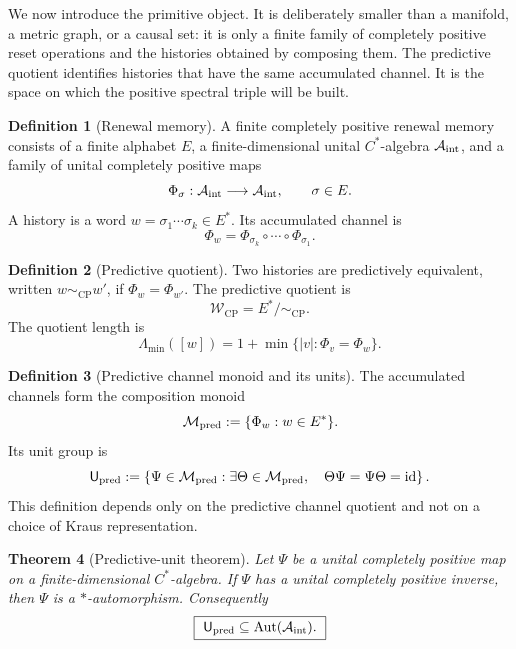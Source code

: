 \documentclass[11pt]{article}
\newtheorem{theorem}{Theorem}[section]
\theoremstyle{definition}
\newtheorem{definition}[theorem]{Definition}
\theoremstyle{remark}
\newcommand{\A}{\mathcal{A}}
\newcommand{\W}{\mathcal{W}}
\newcommand{\M}{\mathcal{M}}
\newcommand{\CP}{\mathrm{CP}}
\newcommand{\Lam}{\Lambda}
\newcommand{\id}{\mathrm{id}}
\begin{document}
We now introduce the primitive object.  It is deliberately smaller than a
manifold, a metric graph, or a causal set: it is only a finite family of
completely positive reset operations and the histories obtained by composing
them.  The predictive quotient identifies histories that have the same accumulated
channel.  It is the space on which the positive spectral triple will be built.

\begin{definition}[Renewal memory]
\label{def:renewal-memory}
A finite completely positive renewal memory consists of a finite alphabet $E$, a finite-dimensional unital $C^*$-algebra $\A_{\rm int}$, and a family of unital completely positive maps
\[
 \Phi_\sigma:\A_{\rm int}\longrightarrow \A_{\rm int},\qquad \sigma\in E.
\]
A history is a word $w=\sigma_1\cdots\sigma_k\in E^*$.  Its accumulated channel is
\[
 \Phi_w=\Phi_{\sigma_k}\circ\cdots\circ\Phi_{\sigma_1}.
\]
\end{definition}

\begin{definition}[Predictive quotient]
\label{def:predictive-quotient}
Two histories are predictively equivalent, written $w\sim_{\CP}w'$, if $\Phi_w=\Phi_{w'}$.  The predictive quotient is
\[
 \W_{\CP}=E^*/{\sim_{\CP}}.
\]
The quotient length is
\[
 \Lam_{\min}([w])=1+\min\{|v|:\Phi_v=\Phi_w\}.
\]
\end{definition}



\begin{definition}[Predictive channel monoid and its units]
\label{def:predictive-channel-monoid}
The accumulated channels form the composition monoid
\[
  \M_{\rm pred}:=\{\Phi_w:w\in E^*\}.
\]
Its unit group is
\[
  \mathsf U_{\rm pred}
  :=\left\{\Psi\in\M_{\rm pred}:
  \exists\Theta\in\M_{\rm pred},\quad
  \Theta\Psi=\Psi\Theta=\id\right\}.
\]
This definition depends only on the predictive channel quotient and not on a
choice of Kraus representation.
\end{definition}

\begin{theorem}[Predictive-unit theorem]
\label{thm:predictive-unit}
Let \(\Psi\) be a unital completely positive map on a finite-dimensional
\(C^*\)-algebra.  If \(\Psi\) has a unital completely positive inverse, then
\(\Psi\) is a \(*\)-automorphism.  Consequently
\[
  \boxed{\ \mathsf U_{\rm pred}
  \subseteq \operatorname{Aut}(\A_{\rm int}).\ }
\]
\end{theorem}
\end{document}

